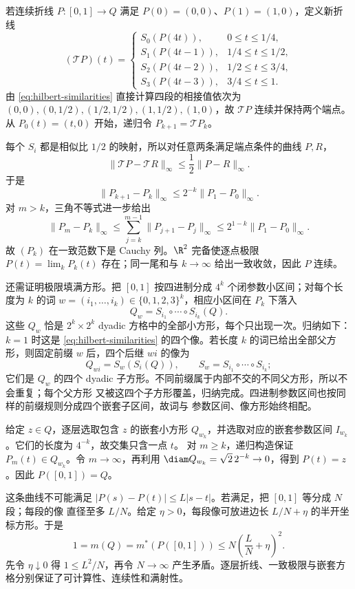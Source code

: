 \begin{example}\label{ex:2-4-3-3}
若连续折线 $P:[0,1]\to Q$ 满足 $P(0)=(0,0)$、$P(1)=(1,0)$，定义新折线
\[
 (\mathcal TP)(t)=
 \begin{cases}
 S_0(P(4t)),&0\le t\le1/4,\\
 S_1(P(4t-1)),&1/4\le t\le1/2,\\
 S_2(P(4t-2)),&1/2\le t\le3/4,\\
 S_3(P(4t-3)),&3/4\le t\le1.
 \end{cases}
 \tag{2.4.18}\label{eq:hilbert-operator}
\]
由 \eqref{eq:hilbert-similarities} 直接计算四段的相接值依次为
$(0,0),(0,1/2),(1/2,1/2),(1,1/2),(1,0)$，故 $\mathcal TP$ 连续并保持两个端点。
从 $P_0(t)=(t,0)$ 开始，递归令 $P_{k+1}=\mathcal TP_k$。

每个 $S_i$ 都是相似比 $1/2$ 的映射，所以对任意两条满足端点条件的曲线 $P,R$，
\[
 \|\mathcal TP-\mathcal TR\|_\infty
 \le\frac12\|P-R\|_\infty.
\]
于是
\[
 \|P_{k+1}-P_k\|_\infty
 \le2^{-k}\|P_1-P_0\|_\infty.
\]
对 $m>k$，三角不等式进一步给出
\[
 \|P_m-P_k\|_\infty
 \le\sum_{j=k}^{m-1}\|P_{j+1}-P_j\|_\infty
 \le 2^{1-k}\|P_1-P_0\|_\infty.
\]
故 $(P_k)$ 在一致范数下是 Cauchy 列。$\R^2$ 完备使逐点极限
$P(t)=\lim_kP_k(t)$ 存在；同一尾和与 $k\to\infty$ 给出一致收敛，因此 $P$ 连续。

还需证明极限填满方形。把 $[0,1]$ 按四进制分成 $4^k$ 个闭参数小区间；对每个长度为 $k$ 的词
$w=(i_1,\dots,i_k)\in\{0,1,2,3\}^k$，相应小区间在 $P_k$ 下落入
\[
 Q_w=S_{i_1}\circ\cdots\circ S_{i_k}(Q).
\]
这些 $Q_w$ 恰是 $2^k\times2^k$ dyadic 方格中的全部小方形，每个只出现一次。归纳如下：$k=1$
时这是 \eqref{eq:hilbert-similarities} 的四个像。若长度 $k$ 的词已给出全部父方形，则固定前缀
$w$ 后，四个后继 $wi$ 的像为
\[
 Q_{wi}=S_w(S_i(Q)),\qquad S_w=S_{i_1}\circ\cdots\circ S_{i_k};
\]
它们是 $Q_w$ 的四个 dyadic 子方形。不同前缀属于内部不交的不同父方形，所以不会重复；每个父方形
又被这四个子方形覆盖，归纳完成。四进制参数区间也按同样的前缀规则分成四个嵌套子区间，故词与
参数区间、像方形始终相配。

给定 $z\in Q$，逐层选取包含 $z$ 的嵌套小方形
$Q_{w_k}$，并选取对应的嵌套参数区间 $I_{w_k}$。它们的长度为 $4^{-k}$，故交集只含一点 $t$。
对 $m\ge k$，递归构造保证 $P_m(t)\in Q_{w_k}$。令 $m\to\infty$，再利用
$\diam Q_{w_k}=\sqrt2\,2^{-k}\to0$，得到 $P(t)=z$。因此 $P([0,1])=Q$。

这条曲线不可能满足 $|P(s)-P(t)|\le L|s-t|$。若满足，把 $[0,1]$ 等分成 $N$ 段；每段的像
直径至多 $L/N$。给定 $\eta>0$，每段像可放进边长 $L/N+\eta$ 的半开坐标方形。于是
\[
 1=m(Q)=m^*(P([0,1]))
 \le N\left(\frac LN+\eta\right)^2.
\]
先令 $\eta\downarrow0$ 得 $1\le L^2/N$，再令 $N\to\infty$ 产生矛盾。逐层折线、一致极限与嵌套方格分别保证了可计算性、连续性和满射性。
\end{example}

